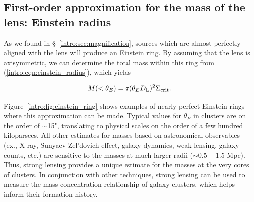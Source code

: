 \subsection{First-order approximation for the mass of the lens: Einstein radius}

As we found in \S~\ref{intro:sec:magnification}, sources which are almost perfectly aligned with the lens will produce an Einstein ring. By assuming that the lens is axisymmetric, we can determine the total mass within this ring from (\ref{intro:eqn:einstein_radius}), which yields

\begin{equation}
M(<\theta_E) = \pi (\theta_E D_\mathrm{L})^2 \Sigma_\mathrm{crit}.
\label{intro:eqn:einstein_mass}
\end{equation}

Figure~\ref{intro:fig:einstein_ring} shows examples of nearly perfect Einstein rings where this approximation can be made. Typical values for $\theta_E$ in clusters are on the order of $\sim$15", translating to physical scales on the order of a few hundred kiloparsecs. All other estimates for masses based on astronomical observables (ex., X-ray, Sunyaev-Zel'dovich effect, galaxy dynamics, weak lensing, galaxy counts, etc.) are sensitive to the masses at much larger radii ($\sim0.5-1.5$ Mpc). Thus, strong lensing provides a unique estimate for the masses at the very cores of clusters. In conjunction with other techniques, strong lensing can be used to measure the mass-concentration relationship of galaxy clusters, which helps inform their formation history.


